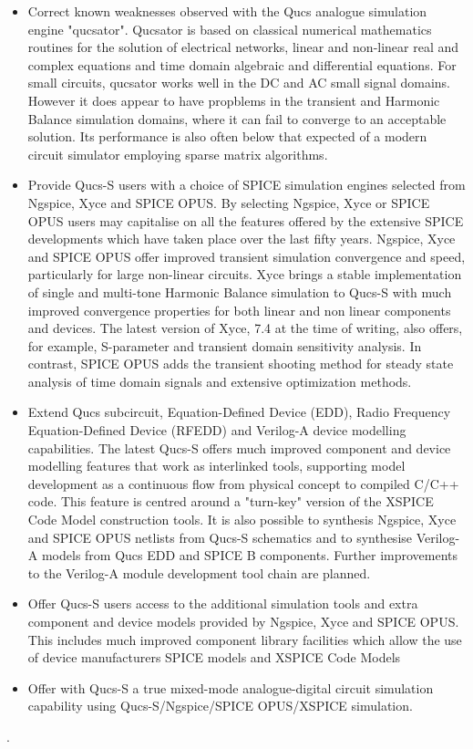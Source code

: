\documentclass[10pt, a4paper]{report}
\begin{document}
\begin{itemize}
	\item { Correct known weaknesses observed with the Qucs analogue simulation engine "qucsator". Qucsator is based on classical numerical mathematics routines for the solution of electrical networks, linear and non-linear real and complex equations and time domain algebraic and differential equations. For small circuits, qucsator works well in the DC and AC small signal domains. However it does appear to have propblems in the transient and Harmonic Balance simulation domains, where it can fail to converge to an acceptable solution.  Its performance is also often below that expected of a modern circuit simulator employing sparse matrix algorithms. }
	\item { Provide Qucs-S users with a choice of SPICE simulation engines selected from Ngspice, Xyce and SPICE OPUS. By selecting Ngspice, Xyce or SPICE OPUS users may capitalise on all the features offered by the extensive SPICE developments which have taken place over the last fifty years.  Ngspice, Xyce and SPICE OPUS offer improved transient simulation convergence and speed, particularly for large non-linear circuits. Xyce brings a stable implementation of single and multi-tone Harmonic Balance simulation to Qucs-S with much improved convergence properties for both linear and non linear components and devices. The latest version of Xyce, 7.4 at the time of writing, also offers, for example, S-parameter and transient domain sensitivity analysis. In contrast, SPICE OPUS adds the transient shooting method for steady state analysis of time domain signals and extensive optimization methods. }
	\item {Extend Qucs subcircuit, Equation-Defined Device (EDD), Radio Frequency Equation-Defined Device (RFEDD) and Verilog-A device modelling capabilities. The latest Qucs-S offers much improved component and device modelling features that work as interlinked tools, supporting model development as a continuous flow from physical concept to compiled C/C++ code.  This feature is centred around a "turn-key" version of the XSPICE Code Model construction tools. It is also possible to synthesis Ngspice, Xyce and SPICE OPUS netlists from Qucs-S schematics and to synthesise Verilog-A models from Qucs EDD and SPICE B components. Further improvements to the Verilog-A module development tool chain are planned.}
	\item {Offer Qucs-S users access to the additional simulation tools and extra component and device models provided by Ngspice, Xyce and SPICE OPUS. This includes much improved component library facilities which allow the use of device manufacturers SPICE models and XSPICE Code Models}
	\item {Offer with Qucs-S a true mixed-mode analogue-digital circuit simulation capability using Qucs-S/Ngspice/SPICE OPUS/XSPICE simulation.}
\end{itemize}
.  
\newline
\end{document}
